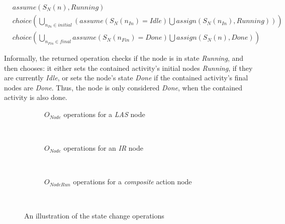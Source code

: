 \begin{definition}
	\begin{align*}
		&\mathit{assume}(S_N(n), \mathit{Running}) \\
		&\mathit{choice}\left(
			\bigcup_{n_\mathit{In} \in \mathit{initial}} \left(\mathit{assume}(S_N(n_\mathit{In}) = \mathit{Idle}) \bigcup \mathit{assign}(S_N(n_\mathit{In}), \mathit{Running})
		\right)\right)\\
		&\mathit{choice}\left(
			\bigcup_{n_\mathit{Fin} \in \mathit{final}} \mathit{assume}(S_N(n_\mathit{Fin}) = \mathit{Done}) \bigcup \mathit{assign}(S_N(n), \mathit{Done})
		\right)
	\end{align*}

	Informally, the returned operation checks if the node is in state \emph{Running}, and then chooses: it either sets the contained activity's initial nodes \emph{Running}, if they are currently \emph{Idle}, or sets the node's state \emph{Done} if the contained activity's final nodes are \emph{Done}. Thus, the node is only considered \emph{Done}, when the contained activity is also done.

\end{definition}

\begin{figure}[!ht]
\centering
\begin{subfigure}[b]{\textwidth}
	\centering
	
	\caption{\(O_\mathit{Node}\) operations for a \emph{LAS} node}
	\label{fig:activity-state-function-las}
\end{subfigure}\\
\vspace{10mm}
\begin{subfigure}[b]{\textwidth}
	\centering
	
	\caption{\(O_\mathit{Node}\) operations for an \emph{IR} node}
	\label{fig:activity-state-function-ir}
\end{subfigure}\\
\vspace{10mm}
\begin{subfigure}[b]{\textwidth}
	\centering
	
	\caption{\(O_\mathit{NodeRun}\) operations for a \emph{composite} action node}
	\label{fig:activity-state-function-composite}
\end{subfigure}\\
\caption{An illustration of the state change operations}
\label{fig:activity-state-functions}
\end{figure}

